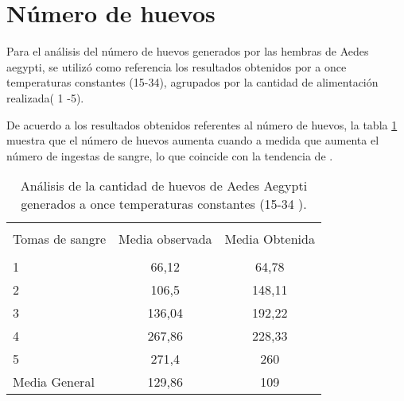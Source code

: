 \section{Número de huevos}
Para el análisis del número de huevos generados por las hembras de Aedes
aegypti, se utilizó como referencia los resultados obtenidos por
\cite{osoriopontificia} a once temperaturas constantes (15-34\textcelsius),
agrupados por la cantidad de alimentación realizada( 1 -5).

De acuerdo a los resultados obtenidos referentes al número de huevos, la tabla
\ref{tab:ovipostura-cantidad-test} muestra que el número de huevos
aumenta cuando a medida que aumenta el número de ingestas de sangre, lo que coincide con la tendencia de \cite{osoriopontificia}.

\begin{table}
    \begin{center}

        \caption{ \label{tab:ovipostura-cantidad-test} Análisis de la
        cantidad de huevos de Aedes Aegypti generados a once temperaturas
        constantes  (15-34 \textcelsius).}
        \begin{tabular}{p{3cm} c c  }
            \hline \\
            Tomas de sangre &Media observada & Media Obtenida \\
            \hline
            \hline \\
            1               & 66,12  & 64,78\\
            2               & 106,5  & 148,11\\
            3               & 136,04 & 192,22\\
            4               & 267,86 & 228,33\\
            5               & 271,4  & 260\\
            Media General   & 129,86 & 109\\
        \end{tabular}
    \end{center}
\end{table}

